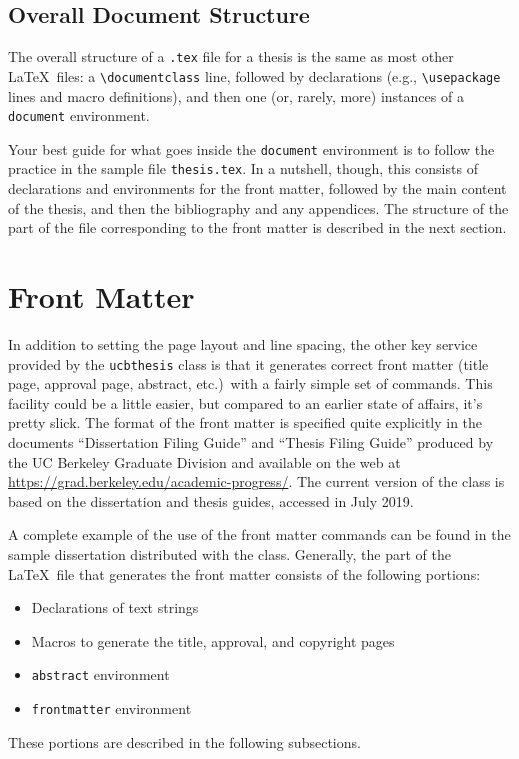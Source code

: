\documentclass[11pt]{article}
\newcommand*{\pkg}[1]{\texttt{#1}}
\begin{document}
\subsection{Overall Document Structure}

The overall structure of a \verb|.tex| file for a thesis is the same as
most other \LaTeX\ files:  a \verb|\documentclass| line, followed by
declarations (e.g., \verb|\usepackage| lines and macro definitions),
and then one (or, rarely, more) instances of a \verb|document| environment.

Your best guide for what goes inside the \verb|document| environment is
to follow the practice in the sample file \verb|thesis.tex|.  In a nutshell,
though, this consists of declarations and environments for the front matter,
followed by the main content of the thesis, and then the bibliography
and any appendices.  The structure of the part of the file
corresponding to the front matter is described in the next section.

\section{Front Matter}

In addition to setting the page layout and line spacing, the other key
service provided by the \pkg{ucbthesis} class is that it generates
correct front matter (title page, approval page, abstract, etc.)\ with
a fairly simple set of commands.  This facility could be a little
easier, but compared to an earlier state of affairs, it's pretty
slick.  The format of the front matter is specified quite explicitly
in the documents ``Dissertation Filing Guide'' and ``Thesis Filing Guide''
produced by the UC Berkeley Graduate Division and available on the web at
\url{https://grad.berkeley.edu/academic-progress/}.
The current version of the class is based on the dissertation and thesis
guides, accessed in July 2019.

A complete example of the use of the front matter commands can be
found in the sample dissertation distributed with the class.
Generally, the part of the \LaTeX\ file that generates the front matter
consists of the following portions:
\begin{itemize}
\item Declarations of text strings
\item Macros to generate the title, approval, and copyright pages
\item \verb|abstract| environment
\item \verb|frontmatter| environment
\end{itemize}
These portions are described in the following subsections.
\end{document}
